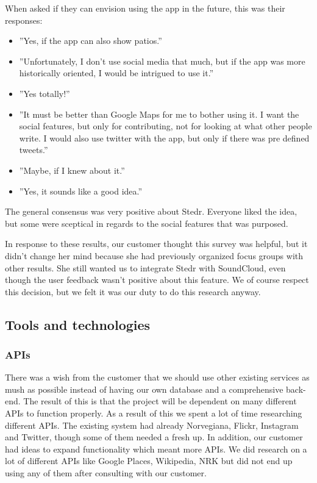 	When asked if they can envision using the app in the future, this was their responses:
\begin{itemize}
	\item ”Yes, if the app can also show patios.”
	\item ”Unfortunately, I don't use social media that much, but if the app was more historically oriented, I would be intrigued to use it.”
	\item ”Yes totally!”
	\item ”It must be better than Google Maps for me to bother using it. I want the social features, but only for contributing, not for looking at what other people write. I would also use twitter with the app, but only if there was pre defined tweets.”
	\item”Maybe, if I knew about it.”
	\item ”Yes, it sounds like a good idea.”
\end{itemize}

	The general consensus was very positive about Stedr. Everyone liked the idea, but some were sceptical in regards to the social features that was purposed.

	In response to these results, our customer thought this survey was helpful, but it didn't change her mind because she had previously organized focus groups with other results. She still wanted us to integrate Stedr with SoundCloud, even though the user feedback wasn't positive about this feature. We of course respect this decision, but we felt it was our duty to do this research anyway.
	
	\subsection{Tools and technologies}
	
		\subsubsection{APIs}
		
		There was a wish from the customer that we should use other existing services as mush as possible instead of having our own database and a comprehensive back-end. The result of this is that the project will be dependent on many different APIs to function properly. As a result of this we spent a lot of time researching different APIs. The existing system had already Norvegiana, Flickr, Instagram and Twitter, though some of them needed a fresh up. In addition, our customer had ideas to expand functionality which meant more APIs. We did research on a lot of different APIs like Google Places, Wikipedia, NRK but did not end up using any of them after consulting with our customer. 
		
